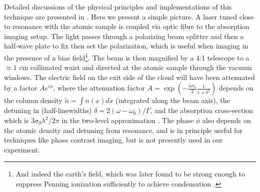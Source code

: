 	Detailed discussions of the physical principles and implementations of this technique are presented in \cite{MakingProbingUnderstanding,TychkovThesis}.
	Here we present a simple picture.
	A laser tuned close to resonance with the atomic sample is coupled via optic fibre to the absorption imaging setup.
	The light passes through a polarizing beam splitter and then a half-wave plate to fix then set the polarization, which is useful when imaging in the presence of a bias field\footnote{And indeed the earth's field, which was later found to be strong enough to suppress Penning ionization sufficiently to achieve condensation \cite{Abbas21}.}.
	The beam is then magnified by a 4:1 telescope to a $\approx1$ cm collimated waist and directed at the atomic sample through the vacuum windows.
	The electric field on the exit side of the cloud will have been attenuated by a factor $Ae^{i\phi}$, where the attenuation factor $A=\exp(-\frac{\tilde{n}\sigma_0}{2}\frac{1}{1+\delta^2})$ depends on the column density  $\tilde{n} = \int n(x) dx$ (integrated along the beam axis), the detuning in (half-linewidths) $\delta=2(\omega-\omega_0)/\Gamma$, and the absorption cross-section which is $3\sigma_0\lambda^2/2\pi$ in the two-level approximation \cite{MakingProbingUnderstanding}.
	The phase $\phi$ also depends on the atomic density and detuning from resonance, and is in principle useful for techniques like phase contrast imaging, but is not presently used in our experiment.

